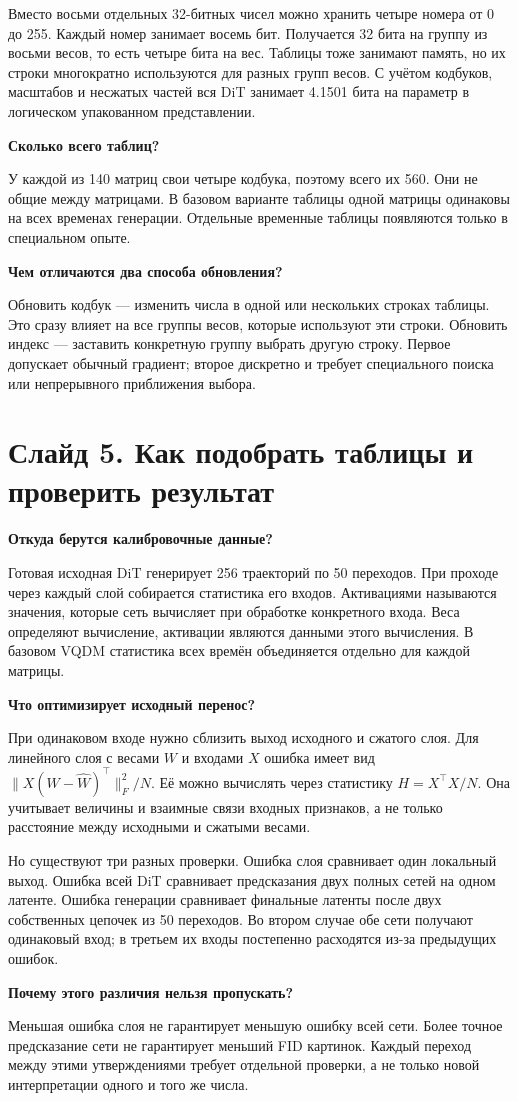 \documentclass[a4paper,11pt]{article}
\newcommand{\slide}[2]{\clearpage\section*{Слайд #1. #2}}
\newcommand{\question}[1]{\par\textbf{#1}\par}
\begin{document}
Вместо восьми отдельных 32-битных чисел можно хранить четыре номера от 0
до 255. Каждый номер занимает восемь бит. Получается 32 бита на группу
из восьми весов, то есть четыре бита на вес. Таблицы тоже занимают память,
но их строки многократно используются для разных групп весов. С учётом
кодбуков, масштабов и несжатых частей вся DiT занимает 4.1501 бита
на параметр в логическом упакованном представлении.

\question{Сколько всего таблиц?}
У каждой из 140 матриц свои четыре кодбука, поэтому всего их 560.
Они не общие между матрицами. В базовом варианте таблицы одной матрицы
одинаковы на всех временах генерации. Отдельные временные таблицы
появляются только в специальном опыте.

\question{Чем отличаются два способа обновления?}
Обновить кодбук --- изменить числа в одной или нескольких строках таблицы.
Это сразу влияет на все группы весов, которые используют эти строки.
Обновить индекс --- заставить конкретную группу выбрать другую строку.
Первое допускает обычный градиент; второе дискретно и требует специального поиска
или непрерывного приближения выбора.

\slide{5}{Как подобрать таблицы и проверить результат}
\question{Откуда берутся калибровочные данные?}
Готовая исходная DiT генерирует 256 траекторий по 50 переходов.
При проходе через каждый слой собирается статистика его входов.
Активациями называются значения, которые сеть вычисляет при обработке
конкретного входа. Веса определяют вычисление, активации являются данными
этого вычисления. В базовом VQDM статистика всех времён объединяется
отдельно для каждой матрицы.

\question{Что оптимизирует исходный перенос?}
При одинаковом входе нужно сблизить выход исходного и сжатого слоя.
Для линейного слоя с весами $W$ и входами $X$ ошибка имеет вид
$\|X(W-\widehat W)^\top\|_F^2/N$. Её можно вычислять через статистику
$H=X^\top X/N$. Она учитывает величины и взаимные связи входных признаков,
а не только расстояние между исходными и сжатыми весами.

Но существуют три разных проверки. Ошибка слоя сравнивает один локальный
выход. Ошибка всей DiT сравнивает предсказания двух полных сетей на одном
латенте. Ошибка генерации сравнивает финальные латенты после двух собственных
цепочек из 50 переходов. Во втором случае обе сети получают одинаковый
вход; в третьем их входы постепенно расходятся из-за предыдущих ошибок.

\question{Почему этого различия нельзя пропускать?}
Меньшая ошибка слоя не гарантирует меньшую ошибку всей сети. Более точное
предсказание сети не гарантирует меньший FID картинок. Каждый переход между
этими утверждениями требует отдельной проверки, а не только новой интерпретации
одного и того же числа.
\end{document}
